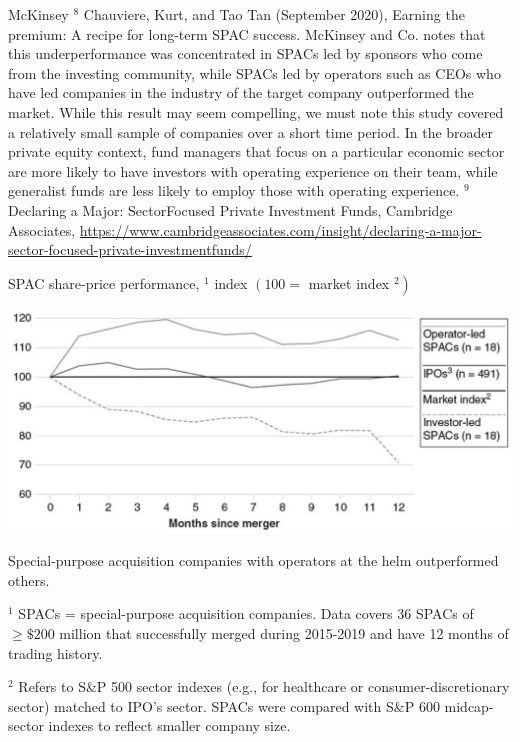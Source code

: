 \documentclass[11pt]{article}
\begin{document}
McKinsey ${ }^{8}$ Chauviere, Kurt, and Tao Tan (September 2020), Earning the premium: A recipe for long-term SPAC success. McKinsey and Co. notes that this underperformance was concentrated in SPACs led by sponsors who come from the investing community, while SPACs led by operators such as CEOs who have led companies in the industry of the target company outperformed the market. While this result may seem compelling, we must note this study covered a relatively small sample of companies over a short time period. In the broader private equity context, fund managers that focus on a particular economic sector are more likely to have investors with operating experience on their team, while generalist funds are less likely to employ those with operating experience. ${ }^{9}$ Declaring a Major: SectorFocused Private Investment Funds, Cambridge Associates, \href{https://www.cambridgeassociates.com/insight/declaring-a-major-sector-focused-private-investmentfunds/}{https://www.cambridgeassociates.com/insight/declaring-a-major-sector-focused-private-investmentfunds/}

SPAC share-price performance, ${ }^{1}$ index $\left(100=\right.$ market index $\left.{ }^{2}\right)$

\begin{center}
\includegraphics[max width=\textwidth]{2024_04_10_a5ce63565cca064665e9g-8}
\end{center}

Special-purpose acquisition companies with operators at the helm outperformed others.

${ }^{1}$ SPACs = special-purpose acquisition companies. Data covers 36 SPACs of $\geq \$ 200$ million that successfully merged during 2015-2019 and have 12 months of trading history.

${ }^{2}$ Refers to S\&P 500 sector indexes (e.g., for healthcare or consumer-discretionary sector) matched to IPO's sector. SPACs were compared with S\&P 600 midcap-sector indexes to reflect smaller company size.
\end{document}
